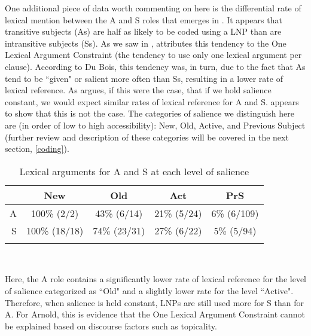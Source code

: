 One additional piece of data worth commenting on here is the differential rate of lexical mention between the A and S roles that emerges in . It appears that transitive subjects (As) are half as likely to be coded using a LNP than are intransitive subjects (Ss). As we saw in , \citet{dubois1987} attributes this tendency to the One Lexical Argument Constraint (the tendency to use only one lexical argument per clause). According to Du Bois, this tendency was, in turn, due to the fact that As tend to be ``given" or salient more often than Ss, resulting in a lower rate of lexical reference. As \citet[237]{arnold2003} argues, if this were the case, that if we hold salience constant, we would expect similar rates of lexical reference for A and S.  appears to show that this is not the case. The categories of salience we distinguish here are (in order of low to high accessibility): New, Old, Active, and Previous Subject (further review and description of these categories will be covered in the next section, \ref{coding}). 

\begin{table} 

\caption{{Lexical arguments for A and S at each level of salience}}
\begin{tabular}{ r  c  c  c  c }
\lsptoprule
 & New & Old & Act & PrS \\

\midrule
 A & 100{\%} (2/2) & 43{\%} (6/14) & 21{\%} (5/24)  & 6{\%} (6/109) \\

 
S & 100{\%} (18/18) & 74{\%} (23/31) & 27{\%} (6/22) & 5{\%} (5/94) \\

\lspbottomrule
\end{tabular}\\
\label{ASsalience}

\end{table}
Here, the A role contains a significantly lower rate of lexical reference for the level of salience categorized as ``Old" and a slightly lower rate for the level ``Active". Therefore, when salience is held constant, LNPs are still used more for S than for A. For Arnold, this is evidence that the One Lexical Argument Constraint cannot be explained based on discourse factors such as topicality.

